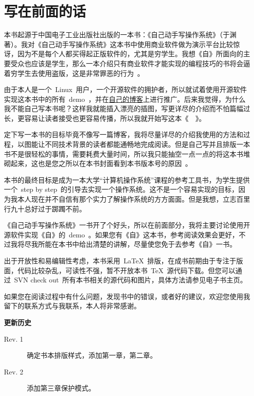 \chapter{写在前面的话} \label{fore}


\begin{kaitext}

本书起源于中国电子工业出版社出版的一本书：《自己动手写操作系统》（于渊著）。我对《自己动手写操作系统》这本书中使用商业软件做为演示平台比较惊讶，因为不是每个人都买得起正版软件的，尤其是穷学生。我想《自》所面向的主要受众也应该是学生，那么一本介绍只有商业软件才能实现的编程技巧的书将会逼着穷学生去使用盗版，这是非常罪恶的行为~\frownie。

由于本人是一个~Linux~用户，一个开源软件的拥护者，所以就试着使用开源软件实现这本书中的所有~demo~，并在\href{http://blog.solrex.cn}{自己的博客}上进行推广。后来我觉得，为什么我不能自己写本书呢？这样我就能插入漂亮的插图，写更详尽的介绍而不怕篇幅过长，更容易让读者接受也更容易传播，所以我就开始写这本《~\BookName~》。

定下写一本书的目标毕竟不像写一篇博客，我将尽量详尽的介绍我使用的方法和过程，以图能让不同技术背景的读者都能通畅地完成阅读。但是自己写并且排版一本书不是很轻松的事情，需要耗费大量时间，所以我只能抽空一点一点的将这本书堆砌起来，这也是您之所以在本书封面看到本书版本号的原因~\smiley。

本书的最终目标是成为一本大学“计算机操作系统”课程的参考工具书，为学生提供一个~step by step~的引导去实现一个操作系统。这不是一个容易实现的目标，因为我本人现在并不自信有那个实力了解操作系统的方方面面。但是我想，立志百里行九十总好过于踯躅不前。

《自己动手写操作系统》一书开了个好头，所以在前面部分，我将主要讨论使用开源软件实现《自》的~demo~。如果您有《自》这本书，参考阅读效果会更好，不过我将尽我所能在本书中给出清楚的讲解，尽量使您免于去参考《自》一书。

出于开放性和易编辑性考虑，本书采用~\LaTeX~排版，在成书前期由于专注于版面，代码比较杂乱，可读性不强，暂不开放本书~\TeX~源代码下载。但您可以通过~SVN check out~所有本书相关的源代码和图片，具体方法请参见电子书主页。

如果您在阅读过程中有什么问题，发现书中的错误，或者好的建议，欢迎您使用我留下的联系方式与我联系，本人将非常感谢。
\vskip 1cm
\noindent
{}
\end{kaitext}

\begin{lined}{\textwidth}
\textbf{更新历史}
\small
\begin{description}
    \item[Rev. 1]~确定书本排版样式，添加第一章，第二章。
    \item[Rev. 2]~添加第三章保护模式。
\end{description}
\vspace{2ex}
\end{lined}

